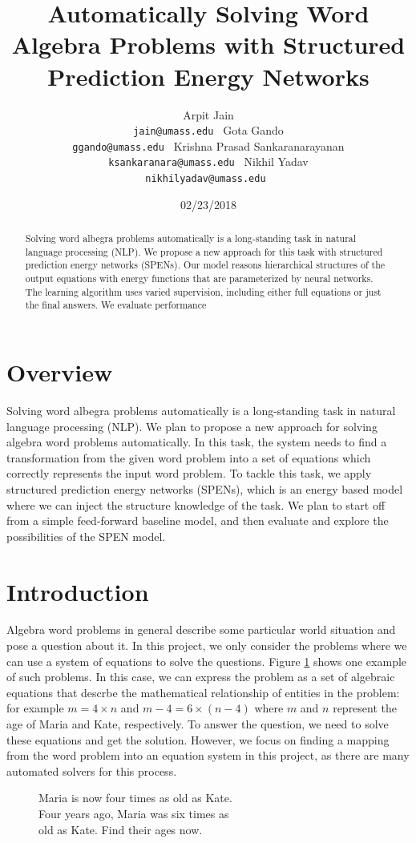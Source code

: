 \documentclass[11pt,letterpaper]{article}
\title{Automatically Solving Word Algebra Problems with Structured Prediction Energy Networks}
\author{Arpit Jain\\ {\tt jain@umass.edu }  \And Gota Gando\\ {\tt ggando@umass.edu } \AND Krishna Prasad Sankaranarayanan\\ {\tt ksankaranara@umass.edu }  \And Nikhil Yadav\\
  {\tt nikhilyadav@umass.edu }}
\date{02/23/2018}
\begin{document}
\maketitle


\begin{abstract}
Solving word albegra problems automatically is a long-standing task in natural language processing (NLP). We propose a new approach for this task with structured prediction energy networks (SPENs). Our model reasons hierarchical structures of the output equations with energy functions that are parameterized by neural networks. The learning algorithm uses varied supervision, including either full equations or just the final answers. We evaluate performance
\end{abstract}
\fi

\section{Overview}
Solving word albegra problems automatically is a long-standing task in natural language processing (NLP). We plan to propose a new approach for solving algebra word problems automatically. In this task, the system needs to find a transformation from the given word problem into a set of equations which correctly represents the input word problem. To tackle this task, we apply structured prediction energy networks (SPENs), which is an energy based model where we can inject the structure knowledge of the task. We plan to start off from a simple feed-forward baseline model, and then evaluate and explore the possibilities of the SPEN model.
\section{Introduction}
Algebra word problems in general describe some particular world situation and pose a question about it. In this project, we only consider the problems where we can use a system of equations to solve the questions. Figure \ref{algebra-example} shows one example of such problems. In this case, we can express the problem as a set of algebraic equations that descrbe the mathematical relationship of entities in the problem: for example $m = 4 \times n$ and $m-4 = 6 \times (n-4)$ where $m$ and $n$ represent the age of Maria and Kate, respectively. To answer the question, we need to solve these equations and get the solution. However, we focus on finding a mapping from the word problem into an equation system in this project, as there are many automated solvers for this process.
\begin{figure}[ht]
	\centering
	Maria is now four times as old as Kate.\\
Four years ago, Maria was six times as\\
old as Kate. Find their ages now.\\
    \label{algebra-example}
\end{figure}
\end{document}
